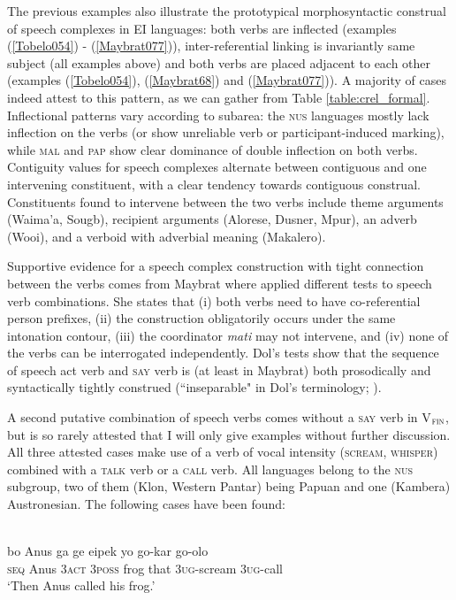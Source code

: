 The previous examples also illustrate the prototypical morphosyntactic construal of speech complexes in EI languages: both verbs are inflected (examples (\ref{Tobelo054}) - (\ref{Maybrat077})), inter-referential linking is invariantly same subject (all examples above) and both verbs are placed adjacent to each other (examples (\ref{Tobelo054}), (\ref{Maybrat68}) and (\ref{Maybrat077})). A majority of cases indeed attest to this pattern, as we can gather from Table \ref{table:crel_formal}. Inflectional patterns vary according to subarea: the \textsc{nus} languages mostly lack inflection on the verbs (or show unreliable verb or participant-induced marking), while \textsc{mal} and \textsc{pap} show clear dominance of double inflection on both verbs. Contiguity values for speech complexes alternate between contiguous and one intervening constituent, with a clear tendency towards contiguous construal. Constituents found to intervene between the two verbs include theme arguments (Waima'a, Sougb), recipient arguments (Alorese, Dusner, Mpur), an adverb (Wooi), and a verboid with adverbial meaning (Makalero).

Supportive evidence for a speech complex construction with tight connection between the verbs comes from Maybrat where \citet[202]{dol2007grammar} applied different tests to speech verb combinations. She states that (i) both verbs need to have co-referential person prefixes, (ii) the construction obligatorily occurs under the same intonation contour, (iii) the coordinator \textit{mati} may not intervene, and (iv) none of the verbs can be interrogated independently. Dol's tests show that the sequence of speech act verb and \textsc{say} verb is (at least in Maybrat) both prosodically and syntactically tightly construed (``inseparable" in Dol's terminology; \citealt[202]{dol2007grammar}).

A second putative combination of speech verbs comes without a \textsc{say} verb in V$_{\textsc{fin}}$, but is so rarely attested that I will only give examples without further discussion. All three attested cases make use of a verb of vocal intensity (\textsc{scream}, \textsc{whisper}) combined with a \textsc{talk} verb or a \textsc{call} verb. All languages belong to the \textsc{nus} subgroup, two of them (Klon, Western Pantar) being Papuan and one (Kambera) Austronesian. The following cases have been found:

\ea \label{Klon077}
\\
\gll bo Anus ga ge eipek yo go-kar go-olo \\
\textsc{seq} Anus \textsc{3}\textsc{act} \textsc{3}\textsc{poss} frog that \textsc{3}\textsc{ug}-scream \textsc{3}\textsc{ug}-call \\
\glft `Then Anus called his frog.' \\ 
\z

